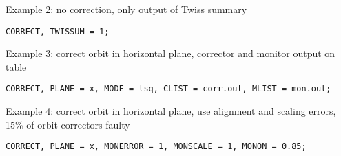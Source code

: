 Example 2: no correction, only output of Twiss summary 
\begin{verbatim}
CORRECT, TWISSUM = 1; 
\end{verbatim}

Example 3: correct orbit in horizontal plane, corrector and monitor output on table
\begin{verbatim}
CORRECT, PLANE = x, MODE = lsq, CLIST = corr.out, MLIST = mon.out;   
\end{verbatim}

Example 4: correct orbit in horizontal plane, use alignment and scaling
errors, 15\% of orbit correctors faulty
\begin{verbatim}
CORRECT, PLANE = x, MONERROR = 1, MONSCALE = 1, MONON = 0.85; 
\end{verbatim}

